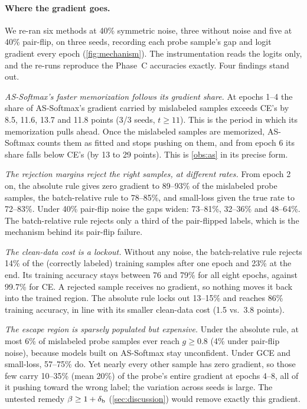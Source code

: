 \paragraph{Where the gradient goes.}
We re-ran six methods at 40\% symmetric noise, three without noise and five at 40\% pair-flip, on
three seeds, recording each probe sample's gap and logit gradient every epoch
(\cref{fig:mechanism}). The instrumentation reads the logits only, and the re-runs reproduce the
Phase~C accuracies exactly. Four findings stand out.

\emph{AS-Softmax's faster memorization follows its gradient share.} At epochs 1--4 the share of
AS-Softmax's gradient carried by mislabeled samples exceeds CE's by 8.5, 11.6, 13.7 and 11.8 points
(3/3 seeds, $t \ge 11$). This is the period in which its memorization pulls ahead. Once the
mislabeled samples are memorized, AS-Softmax counts them as fitted and stops pushing on them, and
from epoch 6 its share falls below CE's (by 13 to 29 points). This is \cref{obs:as} in its
precise form.

\emph{The rejection margins reject the right samples, at different rates.} From epoch 2 on, the
absolute rule gives zero gradient to 89--93\% of the mislabeled probe samples, the batch-relative
rule to 78--85\%, and small-loss given the true rate to 72--83\%. Under 40\% pair-flip noise the
gaps widen: 73--81\%, 32--36\% and 48--64\%. The batch-relative rule rejects only a third of the
pair-flipped labels, which is the mechanism behind its pair-flip failure.

\emph{The clean-data cost is a lockout.} Without any noise, the batch-relative rule rejects 14\%
of the (correctly labeled) training samples after one epoch and 23\% at the end. Its training
accuracy stays between 76 and 79\% for all eight epochs, against 99.7\% for CE. A rejected sample
receives no gradient, so nothing moves it back into the trained region. The absolute rule locks
out 13--15\% and reaches 86\% training accuracy, in line with its smaller clean-data cost (1.5
vs.\ 3.8 points).

\emph{The escape region is sparsely populated but expensive.} Under the absolute rule, at most 6\%
of mislabeled probe samples ever reach $g \ge 0.8$ (4\% under pair-flip noise), because models
built on AS-Softmax stay unconfident. Under GCE and small-loss, 57--75\% do. Yet nearly every other
sample has zero gradient, so those few carry 10--35\% (mean 20\%) of the probe's entire gradient at
epochs 4--8, all of it pushing toward the wrong label; the variation across seeds is large. The
untested remedy $\beta \ge 1 + \delta_{\mathrm{b}}$ (\cref{sec:discussion}) would remove exactly this
gradient.
